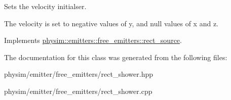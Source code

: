 Sets the velocity initialser. 

The velocity is set to negative values of y, and null values of x and z. 

Implements \hyperlink{classphysim_1_1emitters_1_1free__emitters_1_1rect__source_aace4d8f596f2a138e098ab0f86e927b5}{physim\+::emitters\+::free\+\_\+emitters\+::rect\+\_\+source}.



The documentation for this class was generated from the following files\+:\begin{DoxyCompactItemize}
\item 
physim/emitter/free\+\_\+emitters/rect\+\_\+shower.\+hpp\item 
physim/emitter/free\+\_\+emitters/rect\+\_\+shower.\+cpp\end{DoxyCompactItemize}
